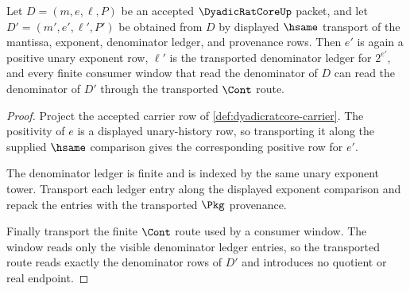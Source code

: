 \begin{theorem}
\label{thm:dyadicratcore-denominator-ledger}
Let $D=(m,e,\ell,P)$ be an accepted $\DyadicRatCoreUp$ packet, and let
$D'=(m',e',\ell',P')$ be obtained from $D$ by displayed $\hsame$ transport of
the mantissa, exponent, denominator ledger, and provenance rows. Then $e'$ is
again a positive unary exponent row, $\ell'$ is the transported denominator
ledger for $2^{e'}$, and every finite consumer window that read the denominator
of $D$ can read the denominator of $D'$ through the transported $\Cont$ route.
\end{theorem}
\begin{proof}
Project the accepted carrier row of \autoref{def:dyadicratcore-carrier}. The
positivity of $e$ is a displayed unary-history row, so transporting it along
the supplied $\hsame$ comparison gives the corresponding positive row for
$e'$.

The denominator ledger is finite and is indexed by the same unary exponent
tower. Transport each ledger entry along the displayed exponent comparison and
repack the entries with the transported $\Pkg$ provenance.

Finally transport the finite $\Cont$ route used by a consumer window. The
window reads only the visible denominator ledger entries, so the transported
route reads exactly the denominator rows of $D'$ and introduces no quotient or
real endpoint.
\end{proof}

